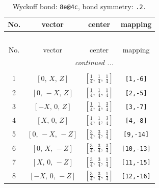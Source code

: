 \documentclass[fleqn,8pt]{jsarticle}
\begin{document}
\begin{longtable}{cccc}
\caption{Wyckoff bond: {\tt 8e@4c}, bond symmetry: {\tt .2.}}
 \\
 \hline \hline
No. & vector & center & mapping \\ \hline \endfirsthead

\multicolumn{3}{l}{\tablename\ \thetable{}} \\
 \hline \hline
No. & vector & center & mapping \\ \hline \endhead

 \hline \hline
\multicolumn{3}{r}{\footnotesize\it continued ...} \\ \endfoot

 \hline \hline
\multicolumn{3}{r}{} \\ \endlastfoot

1 & $\left[ 0,\, X,\, Z \right]$ & $\left[ \frac{1}{4},\, \frac{1}{4},\, \frac{1}{4} \right]$ & {\tt [1,-6]} \\ \hline
2 & $\left[ 0,\, - X,\, Z \right]$ & $\left[ \frac{1}{4},\, \frac{1}{4},\, \frac{1}{4} \right]$ & {\tt [2,-5]} \\ \hline
3 & $\left[ - X,\, 0,\, Z \right]$ & $\left[ \frac{1}{4},\, \frac{1}{4},\, \frac{3}{4} \right]$ & {\tt [3,-7]} \\ \hline
4 & $\left[ X,\, 0,\, Z \right]$ & $\left[ \frac{1}{4},\, \frac{1}{4},\, \frac{3}{4} \right]$ & {\tt [4,-8]} \\ \hline
5 & $\left[ 0,\, - X,\, - Z \right]$ & $\left[ \frac{3}{4},\, \frac{3}{4},\, \frac{3}{4} \right]$ & {\tt [9,-14]} \\ \hline
6 & $\left[ 0,\, X,\, - Z \right]$ & $\left[ \frac{3}{4},\, \frac{3}{4},\, \frac{3}{4} \right]$ & {\tt [10,-13]} \\ \hline
7 & $\left[ X,\, 0,\, - Z \right]$ & $\left[ \frac{3}{4},\, \frac{3}{4},\, \frac{1}{4} \right]$ & {\tt [11,-15]} \\ \hline
8 & $\left[ - X,\, 0,\, - Z \right]$ & $\left[ \frac{3}{4},\, \frac{3}{4},\, \frac{1}{4} \right]$ & {\tt [12,-16]} \\
\end{longtable}
\renewcommand{\arraystretch}{1.2}
\end{document}
